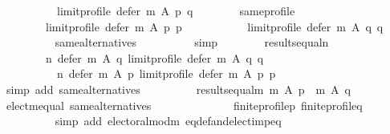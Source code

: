 \begin{isabellebody}
\ \ \ \ \ \ \ \ \ \ limit{\isacharunderscore}{\kern0pt}profile\ {\isacharparenleft}{\kern0pt}defer\ m\ A\ p{\isacharparenright}{\kern0pt}\ q{\isachardoublequoteclose}\isanewline
\ \ \ \ \ \ \isamarkupfalse%
\ same{\isacharunderscore}{\kern0pt}profile{\isacharcolon}{\kern0pt}\isanewline
\ \ \ \ \ \ \ \ {\isachardoublequoteopen}limit{\isacharunderscore}{\kern0pt}profile\ {\isacharparenleft}{\kern0pt}defer\ m\ A\ p{\isacharparenright}{\kern0pt}\ p\ {\isacharequal}{\kern0pt}\isanewline
\ \ \ \ \ \ \ \ \ \ limit{\isacharunderscore}{\kern0pt}profile\ {\isacharparenleft}{\kern0pt}defer\ m\ A\ q{\isacharparenright}{\kern0pt}\ q{\isachardoublequoteclose}\isanewline
\ \ \ \ \ \ \ \ \isamarkupfalse%
\ same{\isacharunderscore}{\kern0pt}alternatives\isanewline
\ \ \ \ \ \ \ \ \isamarkupfalse%
\ simp\isanewline
\ \ \ \ \ \ \isamarkupfalse%
\ results{\isacharunderscore}{\kern0pt}equal{\isacharunderscore}{\kern0pt}n{\isacharcolon}{\kern0pt}\isanewline
\ \ \ \ \ \ \ \ {\isachardoublequoteopen}n\ {\isacharparenleft}{\kern0pt}defer\ m\ A\ q{\isacharparenright}{\kern0pt}\ {\isacharparenleft}{\kern0pt}limit{\isacharunderscore}{\kern0pt}profile\ {\isacharparenleft}{\kern0pt}defer\ m\ A\ q{\isacharparenright}{\kern0pt}\ q{\isacharparenright}{\kern0pt}\ {\isacharequal}{\kern0pt}\isanewline
\ \ \ \ \ \ \ \ \ \ n\ {\isacharparenleft}{\kern0pt}defer\ m\ A\ p{\isacharparenright}{\kern0pt}\ {\isacharparenleft}{\kern0pt}limit{\isacharunderscore}{\kern0pt}profile\ {\isacharparenleft}{\kern0pt}defer\ m\ A\ p{\isacharparenright}{\kern0pt}\ p{\isacharparenright}{\kern0pt}{\isachardoublequoteclose}\isanewline
\ \ \ \ \ \ \ \ \isamarkupfalse%
\ {\isacharparenleft}{\kern0pt}simp\ add{\isacharcolon}{\kern0pt}\ same{\isacharunderscore}{\kern0pt}alternatives{\isacharparenright}{\kern0pt}\isanewline
\ \ \ \ \ \ \isamarkupfalse%
\ \isamarkupfalse%
\ results{\isacharunderscore}{\kern0pt}equal{\isacharunderscore}{\kern0pt}m{\isacharcolon}{\kern0pt}\ {\isachardoublequoteopen}m\ A\ p\ {\isacharequal}{\kern0pt}\ m\ A\ q{\isachardoublequoteclose}\isanewline
\ \ \ \ \ \ \ \ \isamarkupfalse%
\ elect{\isacharunderscore}{\kern0pt}m{\isacharunderscore}{\kern0pt}equal\ same{\isacharunderscore}{\kern0pt}alternatives\isanewline
\ \ \ \ \ \ \ \ \ \ \ \ \ \ finite{\isacharunderscore}{\kern0pt}profile{\isacharunderscore}{\kern0pt}p\ finite{\isacharunderscore}{\kern0pt}profile{\isacharunderscore}{\kern0pt}q\isanewline
\ \ \ \ \ \ \ \ \isamarkupfalse%
\ {\isacharparenleft}{\kern0pt}simp\ add{\isacharcolon}{\kern0pt}\ electoral{\isacharunderscore}{\kern0pt}mod{\isacharunderscore}{\kern0pt}m\ eq{\isacharunderscore}{\kern0pt}def{\isacharunderscore}{\kern0pt}and{\isacharunderscore}{\kern0pt}elect{\isacharunderscore}{\kern0pt}imp{\isacharunderscore}{\kern0pt}eq{\isacharparenright}{\kern0pt}\isanewline

\end{isabellebody}
